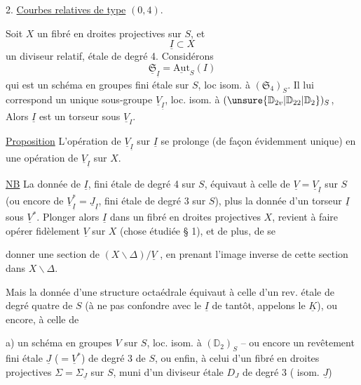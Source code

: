2. \uline{Courbes relatives de type} $(0,4)$.

Soit $X$ un fibré en droites projectives sur $S$, et
\[
 \underline I\subset X \tag*{(9)}
\]
un diviseur relatif, étale de degré 4. Considérons
\[
 \underline{\mathfrak S}_{\underline I}=\underline{\mathrm{Aut}}_S(I) \tag*{(10)}
\]
qui est un schéma en groupes fini étale sur $S$, loc isom. à $(\mathfrak S_4)_S$. Il lui correspond un unique sous-groupe  $\underline V_{\underline I}$, loc. isom. à $(\unsure{\mathbb D_{2v}|\mathbb D_{22}|\mathbb D_2})_S$,  Alors $\underline I$ est un torseur sous $\underline V_I$.

\uline{Proposition} \quad L'opération de $\underline V_{\underline I}$ sur $\underline I$ se prolonge (de façon évidemment unique) en une opération de $\underline V_{\underline I}$ sur $X$.

\uline{NB} La donnée de $\underline I$, fini étale de degré 4 sur $S$, équivaut à celle de $\underline V=\underline V_{\underline I}$ sur $S$ (ou encore de $\underline V_{\underline I}^*=\underline J_{\underline I}$, fini étale de degré 3 sur $S$), plus la donnée d'un torseur $\underline I$ sous $\underline V^*$. Plonger alors $\underline I$ dans un fibré en droites projectives $X$, revient à faire opérer fidèlement $\underline V$ sur $X$ (chose étudiée  § 1), et de plus, de se

donner une section de $(X\smallsetminus\Delta)/\underline V$ , en prenant  l'image inverse de cette section dans $X\smallsetminus\Delta$.

Mais la donnée d'une structure octaédrale équivaut à celle d'un  rev. étale de degré quatre de $S$ (à ne pas confondre avec le $\underline I$ de tantôt, appelons le $\underline K$), ou encore, à celle de

a) un schéma en groupes $V$ sur $S$, loc. isom. à $(\mathbb D_2)_S$ -- ou encore un revêtement fini étale $\underline J$ ($=\underline V^*$) de degré 3 de $S$, ou  enfin, à celui d'un  fibré en droites projectives $\Sigma=\Sigma_{\underline J}$ sur $S$, muni d'un diviseur  étale $D_J$ de degré 3 ( isom.   $\underline J$)

